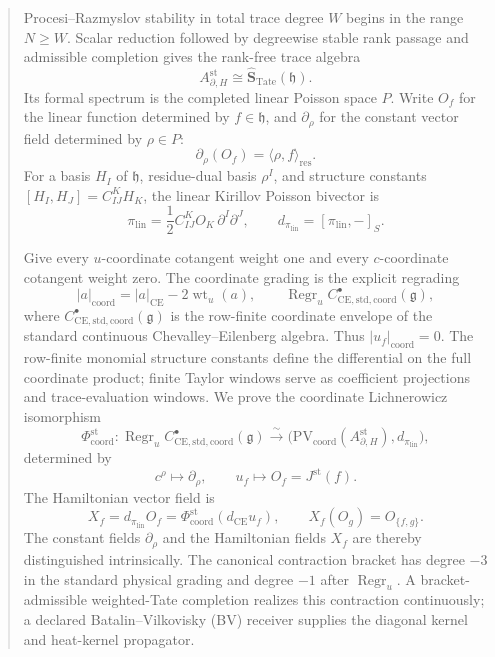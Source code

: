 \begin{abstract}
\medskip\noindent
Procesi--Razmyslov stability in total trace degree \(W\) begins in the
range \(N\geq W\).  Scalar reduction followed by degreewise stable rank
passage and admissible completion gives the rank-free trace algebra
\[
  A^{\mathrm{st}}_{\partial,H}
  \cong\widehat{\mathbf S}_{\mathrm{Tate}}(\mathfrak h).
\]
Its formal spectrum is the completed linear Poisson space \(P\).  Write
\(O_f\) for the linear function determined by \(f\in\mathfrak h\), and
\(\partial_\rho\) for the constant vector field determined by
\(\rho\in P\):
\[
  \partial_\rho(O_f)=\langle\rho,f\rangle_{\mathrm{res}}.
\]
For a basis \(H_I\) of \(\mathfrak h\), residue-dual basis
\(\rho^I\), and structure constants
\([H_I,H_J]=C^K_{IJ}H_K\), the linear Kirillov Poisson bivector is
\[
  \pi_{\mathrm{lin}}
  =\frac12 C^K_{IJ}O_K\,\partial^I\partial^J,
  \qquad
  d_{\pi_{\mathrm{lin}}}=[\pi_{\mathrm{lin}},-]_S.
\]

Give every \(u\)-coordinate cotangent weight one and every
\(c\)-coordinate cotangent weight zero.  The coordinate grading is the
explicit regrading
\[
  |a|_{\mathrm{coord}}
  =|a|_{\mathrm{CE}}-2\operatorname{wt}_u(a),
  \qquad
  \operatorname{Regr}_u
  C^\bullet_{\mathrm{CE},\mathrm{std,coord}}(\mathfrak g),
\]
where \(C^\bullet_{\mathrm{CE},\mathrm{std,coord}}(\mathfrak g)\)
is the row-finite coordinate envelope of the standard continuous
Chevalley--Eilenberg algebra.
Thus \(|u_f|_{\mathrm{coord}}=0\).  The row-finite monomial structure
constants define the differential on the full coordinate product; finite
Taylor windows serve as coefficient projections and trace-evaluation
windows.  We prove the coordinate Lichnerowicz isomorphism
\[
  \Phi^{\mathrm{st}}_{\mathrm{coord}}\colon
  \operatorname{Regr}_u
  C^\bullet_{\mathrm{CE},\mathrm{std,coord}}(\mathfrak g)
  \xrightarrow{\ \sim\ }
  \bigl(
    \mathrm{PV}_{\mathrm{coord}}(A^{\mathrm{st}}_{\partial,H}),
    d_{\pi_{\mathrm{lin}}}\bigr),
\]
determined by
\[
  c^\rho\longmapsto\partial_\rho,
  \qquad
  u_f\longmapsto O_f=J^{\mathrm{st}}(f).
\]
The Hamiltonian vector field is
\[
  X_f=d_{\pi_{\mathrm{lin}}}O_f
      =\Phi^{\mathrm{st}}_{\mathrm{coord}}
        (d_{\mathrm{CE}}u_f),
  \qquad
  X_f(O_g)=O_{\{f,g\}}.
\]
The constant fields \(\partial_\rho\) and the Hamiltonian fields
\(X_f\) are thereby distinguished intrinsically.  The canonical
contraction bracket has degree \(-3\) in the standard physical grading
and degree \(-1\) after \(\operatorname{Regr}_u\).  A bracket-admissible
weighted-Tate completion realizes this contraction continuously; a
declared Batalin--Vilkovisky (BV) receiver supplies the diagonal kernel
and heat-kernel propagator.


\end{abstract}
